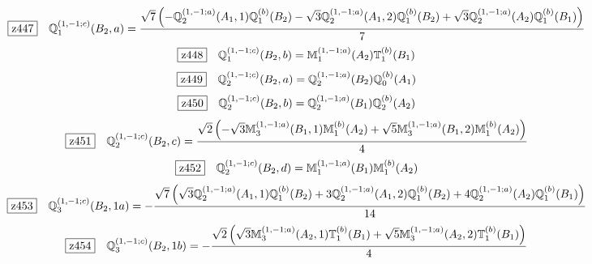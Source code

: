 \documentclass[fleqn,10pt,landscape]{jsarticle}
\begin{document}
\begin{dmath*}
\hspace*{3mm}\fbox{z447}\quad \mathbb{Q}_{1}^{(1,-1;c)}(B_{2},a)=\frac{\sqrt{7} \left(- \mathbb{Q}_{2}^{(1,-1;a)}(A_{1},1) \mathbb{Q}_{1}^{(b)}(B_{2}) - \sqrt{3} \mathbb{Q}_{2}^{(1,-1;a)}(A_{1},2) \mathbb{Q}_{1}^{(b)}(B_{2}) + \sqrt{3} \mathbb{Q}_{2}^{(1,-1;a)}(A_{2}) \mathbb{Q}_{1}^{(b)}(B_{1})\right)}{7}
\end{dmath*}
\begin{dmath*}
\hspace*{3mm}\fbox{z448}\quad \mathbb{Q}_{1}^{(1,-1;c)}(B_{2},b)=\mathbb{M}_{1}^{(1,-1;a)}(A_{2}) \mathbb{T}_{1}^{(b)}(B_{1})
\end{dmath*}
\begin{dmath*}
\hspace*{3mm}\fbox{z449}\quad \mathbb{Q}_{2}^{(1,-1;c)}(B_{2},a)=\mathbb{Q}_{2}^{(1,-1;a)}(B_{2}) \mathbb{Q}_{0}^{(b)}(A_{1})
\end{dmath*}
\begin{dmath*}
\hspace*{3mm}\fbox{z450}\quad \mathbb{Q}_{2}^{(1,-1;c)}(B_{2},b)=\mathbb{Q}_{2}^{(1,-1;a)}(B_{1}) \mathbb{Q}_{2}^{(b)}(A_{2})
\end{dmath*}
\begin{dmath*}
\hspace*{3mm}\fbox{z451}\quad \mathbb{Q}_{2}^{(1,-1;c)}(B_{2},c)=\frac{\sqrt{2} \left(- \sqrt{3} \mathbb{M}_{3}^{(1,-1;a)}(B_{1},1) \mathbb{M}_{1}^{(b)}(A_{2}) + \sqrt{5} \mathbb{M}_{3}^{(1,-1;a)}(B_{1},2) \mathbb{M}_{1}^{(b)}(A_{2})\right)}{4}
\end{dmath*}
\begin{dmath*}
\hspace*{3mm}\fbox{z452}\quad \mathbb{Q}_{2}^{(1,-1;c)}(B_{2},d)=\mathbb{M}_{1}^{(1,-1;a)}(B_{1}) \mathbb{M}_{1}^{(b)}(A_{2})
\end{dmath*}
\begin{dmath*}
\hspace*{3mm}\fbox{z453}\quad \mathbb{Q}_{3}^{(1,-1;c)}(B_{2},1a)=- \frac{\sqrt{7} \left(\sqrt{3} \mathbb{Q}_{2}^{(1,-1;a)}(A_{1},1) \mathbb{Q}_{1}^{(b)}(B_{2}) + 3 \mathbb{Q}_{2}^{(1,-1;a)}(A_{1},2) \mathbb{Q}_{1}^{(b)}(B_{2}) + 4 \mathbb{Q}_{2}^{(1,-1;a)}(A_{2}) \mathbb{Q}_{1}^{(b)}(B_{1})\right)}{14}
\end{dmath*}
\begin{dmath*}
\hspace*{3mm}\fbox{z454}\quad \mathbb{Q}_{3}^{(1,-1;c)}(B_{2},1b)=- \frac{\sqrt{2} \left(\sqrt{3} \mathbb{M}_{3}^{(1,-1;a)}(A_{2},1) \mathbb{T}_{1}^{(b)}(B_{1}) + \sqrt{5} \mathbb{M}_{3}^{(1,-1;a)}(A_{2},2) \mathbb{T}_{1}^{(b)}(B_{1})\right)}{4}
\end{dmath*}
\end{document}
